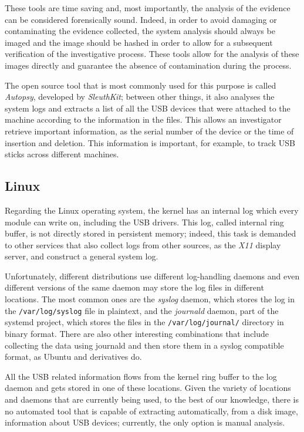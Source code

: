 \documentclass[a4paper]{article}
\begin{document}
These tools are time saving and, most importantly, the analysis of the evidence
can be considered forensically sound. Indeed, in order to avoid damaging or
contaminating the evidence collected, the system analysis should always be
imaged and the image should be hashed in order to allow for a subsequent
verification of the investigative process. These tools allow for the analysis of
these images directly and guarantee the absence of contamination during the
process.~\cite{murphey2007automated}

The open source tool that is most commonly used for this purpose is called
\emph{Autopsy}, developed by \emph{SleuthKit}; between other things, it also
analyses the system logs and extracts a list of all the USB devices that were
attached to the machine according to the information in the files. This allows
an investigator retrieve important information, as the serial number of the
device or the time of insertion and deletion. This information is important, for
example, to track USB sticks across different machines.~\cite{deb2015usb}

\subsection{Linux}
Regarding the Linux operating system, the kernel has an internal log which every
module can write on, including the USB drivers. This log, called internal ring
buffer, is not directly stored in persistent memory; indeed, this task is
demanded to other services that also collect logs from other sources, as the
\emph{X11} display server, and construct a general system log.

Unfortunately, different distributions use different log-handling daemons and
even different versions of the same daemon may store the log files in
different locations. The most common ones are the \emph{syslog} daemon, which
stores the log in the \texttt{/var/log/syslog} file in plaintext, and the
\emph{journald} daemon, part of the systemd project, which stores the files in
the \texttt{/var/log/journal/} directory in binary format. There are also other
interesting combinations that include collecting the data using journald and
then store them in a syslog compatible format, as Ubuntu and derivatives
do.~\cite{poettering2012journal}

All the USB related information flows from the kernel ring buffer to the log
daemon and gets stored in one of these locations. Given the variety of locations
and daemons that are currently being used, to the best of our knowledge, there
is no automated tool that is capable of extracting automatically, from a disk
image, information about USB devices; currently, the only option is manual
analysis.
\end{document}
